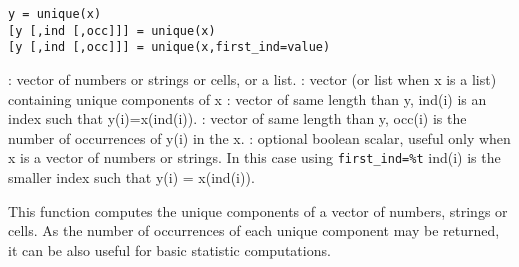
\begin{mandesc}
\end{mandesc}

\begin{calling_sequence}
\begin{verbatim}
y = unique(x)
[y [,ind [,occ]]] = unique(x)
[y [,ind [,occ]]] = unique(x,first_ind=value)
\end{verbatim}
\end{calling_sequence}
\begin{parameters}
  \begin{varlist}
     : vector of numbers or strings or cells, or a list.
     : vector (or list when x is a list) containing unique components of x
     : vector of same length than y, ind(i) is an index
                  such that y(i)=x(ind(i)).
     : vector of same length than y, occ(i) is the number
                  of occurrences of y(i) in the x.
     : optional boolean scalar, useful only when x is a vector
    of numbers or strings. In this case using \verb!first_ind=%t! ind(i) is
    the smaller index such that y(i) = x(ind(i)).
  \end{varlist}
\end{parameters}

\begin{mandescription}
  This function computes the unique components of a vector of numbers,
  strings or cells. As the number of occurrences of each unique
  component may be returned, it can be also useful for basic statistic
  computations.
\end{mandescription}

